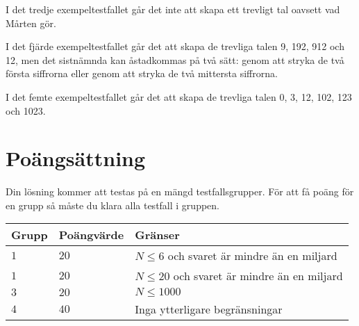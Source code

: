 I det tredje exempeltestfallet går det inte att skapa ett trevligt tal oavsett
vad Mårten gör.

I det fjärde exempeltestfallet går det att skapa de trevliga talen 9, 192, 912 och 12, men det sistnämnda kan åstadkommas på två sätt: genom att stryka de två första siffrorna eller genom att stryka de två mittersta siffrorna.

I det femte  exempeltestfallet går det att skapa de trevliga talen 0, 3, 12, 102, 123 och 1023.


\section*{Poängsättning}
Din lösning kommer att testas på en mängd testfallsgrupper.
För att få poäng för en grupp så måste du klara alla testfall i gruppen.

\noindent
\begin{tabular}{| l | l | l |}
  \hline
  Grupp & Poängvärde & Gränser \\ \hline
  $1$   & $20$       & $N \leq 6$ och svaret är mindre än en miljard \\ \hline
  $1$   & $20$       & $N \leq 20$ och svaret är mindre än en miljard \\ \hline
  $3$   & $20$       & $N \leq 1000$ \\ \hline
  $4$   & $40$       & Inga ytterligare begränsningar \\ \hline
\end{tabular}
